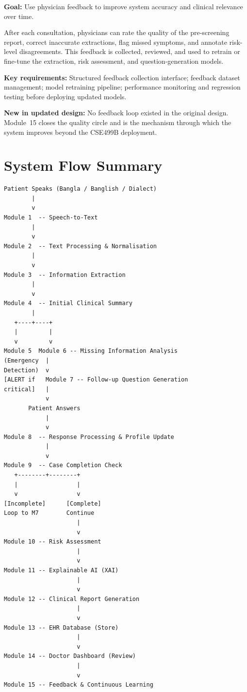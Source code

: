 \documentclass[12pt,a4paper]{article}
\begin{document}
\textbf{Goal:} Use physician feedback to improve system accuracy and
clinical relevance over time.

After each consultation, physicians can rate the quality of the
pre-screening report, correct inaccurate extractions, flag missed
symptoms, and annotate risk-level disagreements. This feedback is
collected, reviewed, and used to retrain or fine-tune the extraction,
risk assessment, and question-generation models.

\textbf{Key requirements:} Structured feedback collection interface;
feedback dataset management; model retraining pipeline; performance
monitoring and regression testing before deploying updated models.

\textbf{New in updated design:} No feedback loop existed in the original
design. Module~15 closes the quality circle and is the mechanism through
which the system improves beyond the CSE499B deployment.

\section{System Flow Summary}
\label{sec:flow}

\begin{verbatim}
Patient Speaks (Bangla / Banglish / Dialect)
        |
        v
Module 1  -- Speech-to-Text
        |
        v
Module 2  -- Text Processing & Normalisation
        |
        v
Module 3  -- Information Extraction
        |
        v
Module 4  -- Initial Clinical Summary
        |
   +----+----+
   |         |
   v         v
Module 5  Module 6 -- Missing Information Analysis
(Emergency  |
Detection)  v
[ALERT if   Module 7 -- Follow-up Question Generation
critical]   |
            v
       Patient Answers
            |
            v
Module 8  -- Response Processing & Profile Update
            |
            v
Module 9  -- Case Completion Check
   +--------+--------+
   |                 |
   v                 v
[Incomplete]      [Complete]
Loop to M7        Continue
                     |
                     v
Module 10 -- Risk Assessment
                     |
                     v
Module 11 -- Explainable AI (XAI)
                     |
                     v
Module 12 -- Clinical Report Generation
                     |
                     v
Module 13 -- EHR Database (Store)
                     |
                     v
Module 14 -- Doctor Dashboard (Review)
                     |
                     v
Module 15 -- Feedback & Continuous Learning
\end{verbatim}
\end{document}
